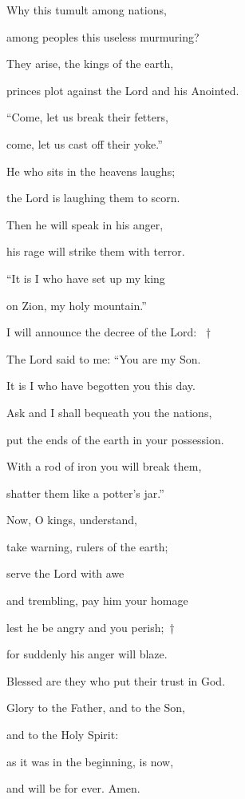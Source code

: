 \noindent Why this tumult among nations,~\GreStar{}~\nopagebreak

among peoples this useless murmuring?

\noindent They arise, the kings of the earth,~\GreStar{}~\nopagebreak

princes plot against the Lord and his Anointed.

\noindent “Come, let us break their fetters,~\GreStar{}~\nopagebreak

come, let us cast off their yoke.”

\noindent He who sits in the heavens laughs;~\GreStar{}~\nopagebreak

the Lord is laughing them to scorn.

\noindent Then he will speak in his anger,~\GreStar{}~\nopagebreak

his rage will strike them with terror.

\noindent “It is I who have set up my king~\GreStar{}~\nopagebreak

on Zion, my holy mountain.”

\noindent I will announce the decree of the Lord: ~†~\nopagebreak

The Lord said to me: “You are my Son.~\GreStar{}~\nopagebreak

It is I who have begotten you this day.

\noindent Ask and I shall bequeath you the nations,~\GreStar{}~\nopagebreak

put the ends of the earth in your possession.

\noindent With a rod of iron you will break them,~\GreStar{}~\nopagebreak

shatter them like a potter’s jar.”

\noindent Now, O kings, understand,~\GreStar{}~\nopagebreak

take warning, rulers of the earth;

\noindent serve the Lord with awe~\GreStar{}~\nopagebreak

and trembling, pay him your homage

\noindent lest he be angry and you perish;~†~\nopagebreak

for suddenly his anger will blaze.~\GreStar{}~\nopagebreak

Blessed are they who put their trust in God.

\noindent Glory to the Father, and to the Son,~\GreStar{}~\nopagebreak

and to the Holy Spirit:

\noindent as it was in the beginning, is now,~\GreStar{}~\nopagebreak

and will be for ever. Amen.
